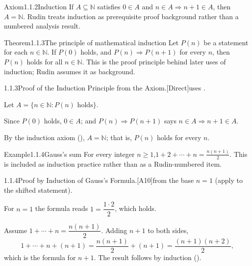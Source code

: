 \documentclass[main.tex]{subfiles}
\begin{document}
\begin{Obj}{Axiom}{1.1.2}{Induction}
If $A\subseteq\mathbb N$ satisfies $0\in A$ and $n\in A\Rightarrow n+1\in A$, then $A=\mathbb N$.
Rudin treats induction as prerequisite proof background rather than a numbered analysis result.
\end{Obj}

\begin{Obj}{Theorem}{1.1.3}{The principle of mathematical induction}
Let $P(n)$ be a statement for each $n\in\mathbb N$. If $P(0)$ holds, and $P(n)\Rightarrow P(n+1)$
for every $n$, then $P(n)$ holds for all $n\in\mathbb N$.
This is the proof principle behind later uses of induction; Rudin assumes it as background.
\end{Obj}
\begin{Prf}{1.1.3}{Proof of the Induction Principle from the Axiom.}{[Direct]\quad uses .}
\item Let $A=\{n\in\mathbb N : P(n)\text{ holds}\}$.
\item Since $P(0)$ holds, $0\in A$; and $P(n)\Rightarrow P(n+1)$ says $n\in A\Rightarrow n+1\in A$.
\item By the induction axiom (), $A=\mathbb N$; that is, $P(n)$ holds for every $n$.
\end{Prf}

\begin{ObjL}{Example}{1.1.4}{Gauss's sum}
For every integer $n\ge1$,\qquad $\displaystyle 1+2+\cdots+n=\frac{n(n+1)}{2}$.
This is included as induction practice rather than as a Rudin-numbered item.
\end{ObjL}
\begin{Prf}{1.1.4}{Proof by Induction of Gauss's Formula.}{[A10]\quad from the base $n=1$ (apply  to the shifted statement).}
\item For $n=1$ the formula reads $1=\dfrac{1\cdot2}{2}$, which holds.
\item Assume $1+\cdots+n=\dfrac{n(n+1)}{2}$. Adding $n+1$ to both sides,
  \[ 1+\cdots+n+(n+1)=\frac{n(n+1)}{2}+(n+1)=\frac{(n+1)(n+2)}{2}, \]
  which is the formula for $n+1$. The result follows by induction ().
\end{Prf}
\end{document}
